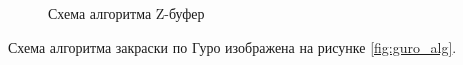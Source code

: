 \begin{figure}[ph!]
	\caption{Схема алгоритма Z-буфер}
	\label{fig:z_buf_alg}
\end{figure}

\clearpage

Схема алгоритма закраски по Гуро изображена на рисунке \ref{fig:guro_alg}.

